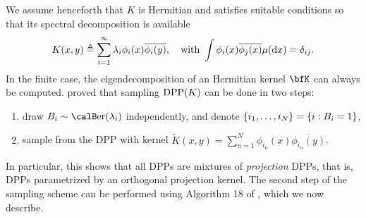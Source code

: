 \documentclass[twoside,11pt]{article}
\begin{document}
      We assume henceforth that $K$ is Hermitian and satisfies suitable conditions \cite[Theorem 3]{Sos00} so that its spectral decomposition is available
      \begin{equation*}
      \label{eq:eigdec_kernel}
        K(x,y)\triangleq\sum\limits_{i=1}^{\infty} \lambda_i \phi_i(x) \overline{\phi_i(y)},
        \quad \text{with }
        \int \phi_i(x) \overline{\phi_j(x)} \mu(\mathop{}\!\mathrm{d} x) = \delta_{ij}.
      \end{equation*}
      In the finite case, the eigendecomposition of an Hermitian kernel $\bfK$ can always be computed.
      \citet[Theorem 7]{HKPV06} proved that sampling $\operatorname{DPP}(K)$ can be done in two steps:
      \begin{enumerate}
        \item draw $B_i\sim\Ber(\lambda_i)$ independently, and denote $\left\{ i_1,\dots,i_{N} \right\} = \left\{ i:B_i=1 \right\}$,
        \item sample from the DPP with kernel $\tilde{K}(x,y) = \sum_{n=1}^{N}\phi_{i_n}(x) \overline{\phi_{i_n}(y)}$.
      \end{enumerate}
      In particular, this shows that all DPPs are mixtures of \emph{projection} DPPs, that is, DPPs parametrized by an orthogonal projection kernel.
      The second step of the sampling scheme can be performed using Algorithm 18 of \cite{HKPV06}, which we now describe.
\end{document}
